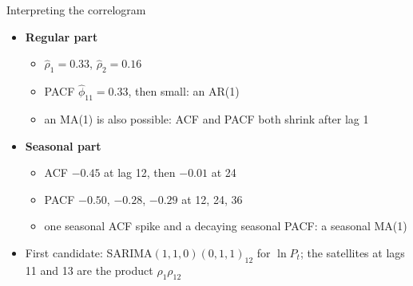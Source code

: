 \begin{frame}{Interpreting the correlogram}
\itemsize{\small}
\begin{itemize}
    \item \textbf{Regular part}
    \begin{itemize}
        \item $\hat\rho_1 = 0.33$, $\hat\rho_2 = 0.16$
        \item PACF $\hat\phi_{11} = 0.33$, then small: an AR(1)
        \item an MA(1) is also possible: ACF and PACF both shrink after lag 1
    \end{itemize}
    \item \textbf{Seasonal part}
    \begin{itemize}
        \item ACF $\ensuremath{-}0.45$ at lag 12, then $\ensuremath{-}0.01$ at 24
        \item PACF $\ensuremath{-}0.50$, $\ensuremath{-}0.28$, $\ensuremath{-}0.29$ at 12, 24, 36
        \item one seasonal ACF spike and a decaying seasonal PACF: a seasonal MA(1)
    \end{itemize}
    \item First candidate: SARIMA$(1,1,0)(0,1,1)_{12}$ for $\ln P_t$; the satellites at lags 11 and 13 are the product $\rho_1\rho_{12}$
\end{itemize}
\end{frame}

